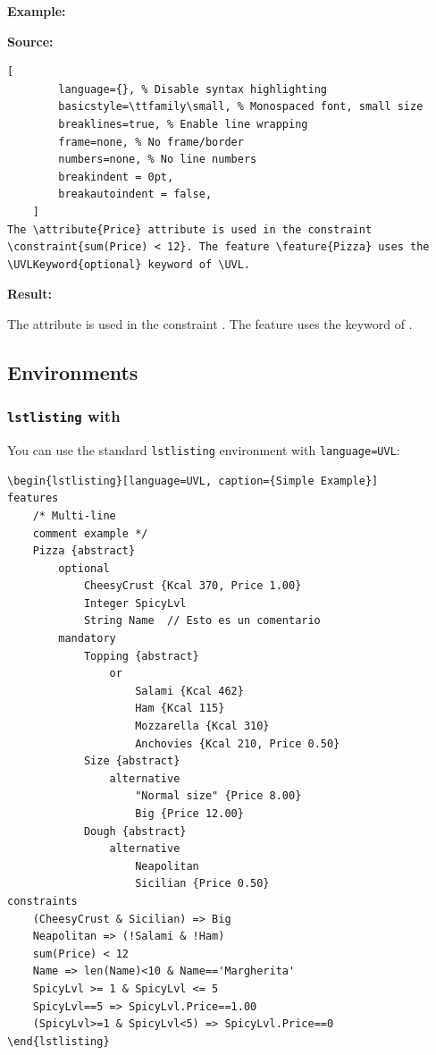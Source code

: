 \noindent \textbf{Example:}
\begin{tcolorbox}[colback=gray!5, colframe=gray!50, title=Inline Formatting Example]
    \textbf{Source:}
    \begin{lstlisting}[
        language={}, % Disable syntax highlighting
        basicstyle=\ttfamily\small, % Monospaced font, small size
        breaklines=true, % Enable line wrapping
        frame=none, % No frame/border
        numbers=none, % No line numbers
        breakindent = 0pt,
        breakautoindent = false,
    ]
The \attribute{Price} attribute is used in the constraint \constraint{sum(Price) < 12}. The feature \feature{Pizza} uses the \UVLKeyword{optional} keyword of \UVL.
    \end{lstlisting}

    \vspace{0.5em}
    \textbf{Result:} 
    \par
    \noindent \small 
    The  attribute is used in the constraint .
    The feature  uses the  keyword of \UVL.
\end{tcolorbox}

\subsection{Environments}

\subsubsection{\texttt{lstlisting} with \UVL}
You can use the standard \texttt{lstlisting} environment with \texttt{language=UVL}:

{\scriptsize
\begin{verbatim}
\begin{lstlisting}[language=UVL, caption={Simple Example}]
features
    /* Multi-line
    comment example */
	Pizza {abstract}
		optional
			CheesyCrust {Kcal 370, Price 1.00}
			Integer SpicyLvl
			String Name  // Esto es un comentario
		mandatory
			Topping {abstract}
				or
					Salami {Kcal 462}
					Ham {Kcal 115}
					Mozzarella {Kcal 310}
					Anchovies {Kcal 210, Price 0.50}
			Size {abstract}
				alternative
					"Normal size" {Price 8.00}
					Big {Price 12.00}
			Dough {abstract}
				alternative
					Neapolitan 
					Sicilian {Price 0.50}
constraints
	(CheesyCrust & Sicilian) => Big
	Neapolitan => (!Salami & !Ham)
	sum(Price) < 12
	Name => len(Name)<10 & Name=='Margherita'
	SpicyLvl >= 1 & SpicyLvl <= 5
	SpicyLvl==5 => SpicyLvl.Price==1.00
	(SpicyLvl>=1 & SpicyLvl<5) => SpicyLvl.Price==0
\end{lstlisting}
\end{verbatim}
}

